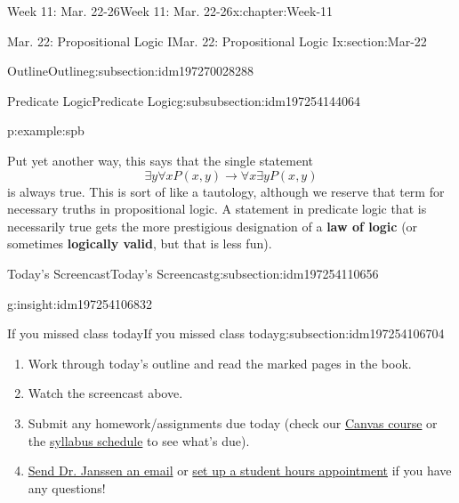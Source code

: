 \documentclass[oneside,10pt,]{book}
\newcommand{\terminology}[1]{\textbf{#1}}
\numberwithin{equation}{section}
\def\imp{\to}
\newcommand{\imp}{\rightarrow}
\begin{document}
\begin{chapterptx}{Week 11: Mar. 22-26}{}{Week 11: Mar. 22-26}{}{}{x:chapter:Week-11}
\begin{sectionptx}{Mar. 22: Propositional Logic I}{}{Mar. 22: Propositional Logic I}{}{}{x:section:Mar-22}
\begin{subsectionptx}{Outline}{}{Outline}{}{}{g:subsection:idm197270028288}
\begin{subsubsectionptx}{Predicate Logic}{}{Predicate Logic}{}{}{g:subsubsection:idm197254144064}
\begin{example}{}{p:example:spb}
\begin{sidebyside}{1}{0}{0}{0}
\begin{sbspanel}{1}
{}%
\end{sbspanel}%
\end{sidebyside}%
\par
Put yet another way, this says that the single statement%
\begin{equation*}
\exists y \forall x P(x,y) \imp \forall x \exists y P(x,y)
\end{equation*}
is always true. This is sort of like a tautology, although we reserve that term for necessary truths in propositional logic. A statement in predicate logic that is necessarily true gets the more prestigious designation of a \terminology{law of logic}  (or sometimes \terminology{logically valid},  but that is less fun).%
\end{example}
\end{subsubsectionptx}
\end{subsectionptx}
%
%
\typeout{************************************************}
\typeout{************************************************}
%
\begin{subsectionptx}{Today's Screencast}{}{Today's Screencast}{}{}{g:subsection:idm197254110656}
\begin{insight}{}{g:insight:idm197254106832}%
\end{insight}
\end{subsectionptx}
%
%
\typeout{************************************************}
\typeout{************************************************}
%
\begin{subsectionptx}{If you missed class today}{}{If you missed class today}{}{}{g:subsection:idm197254106704}
%
\begin{enumerate}
\item{}Work through today's outline and read the marked pages in the book.%
\item{}Watch the screencast above.%
\item{}Submit any homework\slash{}assignments due today (check our \href{https://dordt.instructure.com/courses/3110050}{Canvas course} or the \href{https://prof.mkjanssen.org/ds/index.html\#schedule}{syllabus schedule} to see what's due).%
\item{}\href{mailto:mike.janssen@dordt.edu}{Send Dr. Janssen an email} or \href{https://calendly.com/mkjanssen/student-hours}{set up a student hours appointment} if you have any questions!%
\end{enumerate}

\end{subsectionptx}
\end{sectionptx}
\end{chapterptx}
\end{document}
